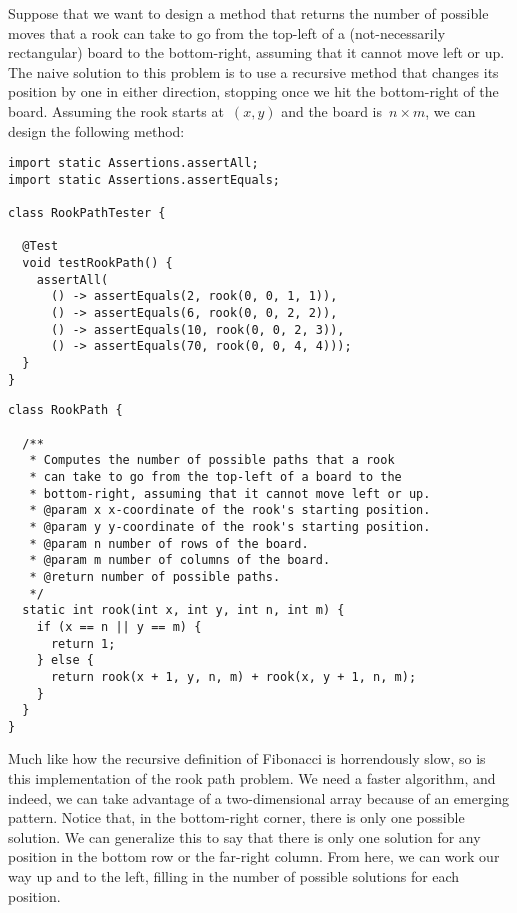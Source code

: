 \enlargethispage{2\baselineskip}
Suppose that we want to design a method that returns the number of possible moves that a rook can take to go from the top-left of a (not-necessarily rectangular) board to the bottom-right, assuming that it cannot move left or up. 
The naive solution to this problem is to use a recursive method that changes its position by one in either direction, stopping once we hit the bottom-right of the board. 
Assuming the rook starts at~$(x, y)$ and the board is~$n \times m$, we can design the following method:

\begin{lstlisting}[language=MyJava]
import static Assertions.assertAll;
import static Assertions.assertEquals;

class RookPathTester {

  @Test
  void testRookPath() {
    assertAll(
      () -> assertEquals(2, rook(0, 0, 1, 1)),
      () -> assertEquals(6, rook(0, 0, 2, 2)),
      () -> assertEquals(10, rook(0, 0, 2, 3)),
      () -> assertEquals(70, rook(0, 0, 4, 4)));
  }
}
\end{lstlisting}

\begin{lstlisting}[language=MyJava]
class RookPath {

  /**
   * Computes the number of possible paths that a rook 
   * can take to go from the top-left of a board to the 
   * bottom-right, assuming that it cannot move left or up.
   * @param x x-coordinate of the rook's starting position.
   * @param y y-coordinate of the rook's starting position.
   * @param n number of rows of the board.
   * @param m number of columns of the board.
   * @return number of possible paths.
   */
  static int rook(int x, int y, int n, int m) {
    if (x == n || y == m) { 
      return 1; 
    } else { 
      return rook(x + 1, y, n, m) + rook(x, y + 1, n, m); 
    }
  }
}
\end{lstlisting}

Much like how the recursive definition of Fibonacci is horrendously slow, so is this implementation of the rook path problem. 
We need a faster algorithm, and indeed, we can take advantage of a two-dimensional array because of an emerging pattern. 
Notice that, in the bottom-right corner, there is only one possible solution. 
We can generalize this to say that there is only one solution for any position in the bottom row or the far-right column. 
From here, we can work our way up and to the left, filling in the number of possible solutions for each position. 

